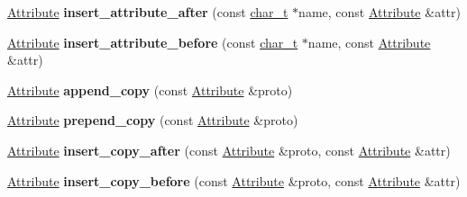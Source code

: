 \begin{DoxyCompactItemize}
\item 
\hypertarget{classphys_1_1xml_1_1Node_aae7d7e21d419c9f95549d14ddccb1334}{
\hyperlink{classphys_1_1xml_1_1Attribute}{Attribute} {\bfseries insert\_\-attribute\_\-after} (const \hyperlink{namespacephys_1_1xml_afc87705cd1c2917d87b879715a2d8f6e}{char\_\-t} $\ast$name, const \hyperlink{classphys_1_1xml_1_1Attribute}{Attribute} \&attr)}
\label{d7/d0a/classphys_1_1xml_1_1Node_aae7d7e21d419c9f95549d14ddccb1334}

\item 
\hypertarget{classphys_1_1xml_1_1Node_a0b22783a8ce773f7b3847d7f2ec9b475}{
\hyperlink{classphys_1_1xml_1_1Attribute}{Attribute} {\bfseries insert\_\-attribute\_\-before} (const \hyperlink{namespacephys_1_1xml_afc87705cd1c2917d87b879715a2d8f6e}{char\_\-t} $\ast$name, const \hyperlink{classphys_1_1xml_1_1Attribute}{Attribute} \&attr)}
\label{d7/d0a/classphys_1_1xml_1_1Node_a0b22783a8ce773f7b3847d7f2ec9b475}

\item 
\hypertarget{classphys_1_1xml_1_1Node_a8067d9c5861a4dc89c644eded1987b7d}{
\hyperlink{classphys_1_1xml_1_1Attribute}{Attribute} {\bfseries append\_\-copy} (const \hyperlink{classphys_1_1xml_1_1Attribute}{Attribute} \&proto)}
\label{d7/d0a/classphys_1_1xml_1_1Node_a8067d9c5861a4dc89c644eded1987b7d}

\item 
\hypertarget{classphys_1_1xml_1_1Node_a875eb8b249394050178e26d978a247cf}{
\hyperlink{classphys_1_1xml_1_1Attribute}{Attribute} {\bfseries prepend\_\-copy} (const \hyperlink{classphys_1_1xml_1_1Attribute}{Attribute} \&proto)}
\label{d7/d0a/classphys_1_1xml_1_1Node_a875eb8b249394050178e26d978a247cf}

\item 
\hypertarget{classphys_1_1xml_1_1Node_a0d12c7f719d26042afb83b8045babbf0}{
\hyperlink{classphys_1_1xml_1_1Attribute}{Attribute} {\bfseries insert\_\-copy\_\-after} (const \hyperlink{classphys_1_1xml_1_1Attribute}{Attribute} \&proto, const \hyperlink{classphys_1_1xml_1_1Attribute}{Attribute} \&attr)}
\label{d7/d0a/classphys_1_1xml_1_1Node_a0d12c7f719d26042afb83b8045babbf0}

\item 
\hypertarget{classphys_1_1xml_1_1Node_af4b5824124e70eda957c410e66123896}{
\hyperlink{classphys_1_1xml_1_1Attribute}{Attribute} {\bfseries insert\_\-copy\_\-before} (const \hyperlink{classphys_1_1xml_1_1Attribute}{Attribute} \&proto, const \hyperlink{classphys_1_1xml_1_1Attribute}{Attribute} \&attr)}
\label{d7/d0a/classphys_1_1xml_1_1Node_af4b5824124e70eda957c410e66123896}


\end{DoxyCompactItemize}
